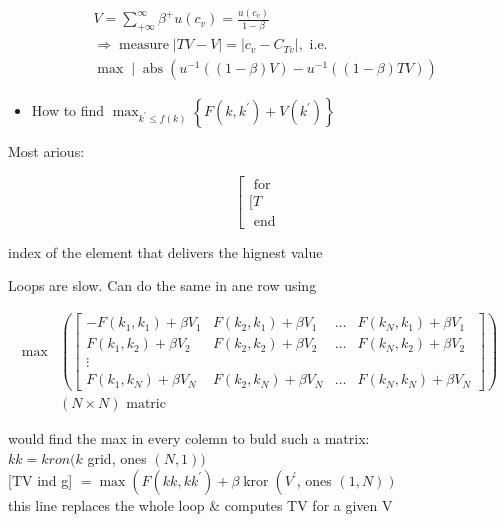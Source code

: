 \documentclass[10pt]{article}
\begin{document}
$$
\begin{aligned}
& V=\sum_{+\infty}^{\infty} \beta^{+} u\left(c_{v}\right)=\frac{u\left(c_{v}\right)}{1-\beta} \\
& \Rightarrow \operatorname{measure}|T V-V|=\left|c_{v}-C_{T v}\right|, \text { i.e. } \\
& \max \mid \operatorname{abs}\left(u^{-1}((1-\beta) V)-u^{-1}((1-\beta) T V)\right)
\end{aligned}
$$

\begin{itemize}
  \item How to find $\max _{k^{\prime} \leq f(k)}\left\{F\left(k, k^{\prime}\right)+V\left(k^{\prime}\right)\right\}$
\end{itemize}

Most arious:

$$
\left[\begin{array}{l}
\text { for } \\
{[T} \\
\text { end }
\end{array}\right.
$$

index of the element that delivers the hignest value

Loops are slow. Can do the same in ane row using

$$
\begin{aligned}
\max & \left(\left[\begin{array}{cccc}
-F\left(k_{1}, k_{1}\right)+\beta V_{1} & F\left(k_{2}, k_{1}\right)+\beta V_{1} & \ldots & F\left(k_{N}, k_{1}\right)+\beta V_{1} \\
F\left(k_{1}, k_{2}\right)+\beta V_{2} & F\left(k_{2}, k_{2}\right)+\beta V_{2} & \ldots & F\left(k_{N}, k_{2}\right)+\beta V_{2} \\
\vdots & & & \\
F\left(k_{1}, k_{N}\right)+\beta V_{N} & F\left(k_{2}, k_{N}\right)+\beta V_{N} & \ldots & F\left(k_{N}, k_{N}\right)+\beta V_{N}
\end{array}\right]\right) \\
& (N \times N) \text { matric }
\end{aligned}
$$

would find the max in every colemn to buld such a matrix:\\
$k k=k r o n(k$ grid, ones $(N, 1))$\\[0pt]
[TV ind g] $=\max \left(F\left(k k, k k^{\prime}\right)+\beta \operatorname{kror}\left(V^{\prime}\right.\right.$, ones $\left.(1, N)\right)$\\
this line replaces the whole loop \& computes TV for a given V
\end{document}
